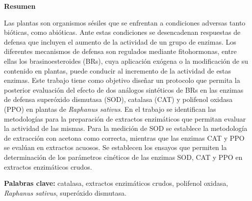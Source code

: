 {\bf \LARGE Resumen}

\medskip
\medskip
\medskip
\medskip
\medskip
\medskip

Las plantas son organismos sésiles que se enfrentan a condiciones adversas tanto bióticas, como abióticas. Ante estas condiciones se desencadenan respuestas de defensa que incluyen el aumento de la actividad de un grupo de enzimas. Los diferentes mecanismos de defensa son regulados mediante fitohormonas, entre ellas los brasinoesteroides (BRs), cuya aplicación exógena o la modificación de su contenido en plantas, puede conducir al incremento de la actividad de estas enzimas. Este trabajo tiene como objetivo diseñar un protocolo que permita la posterior evaluación del efecto de dos análogos sintéticos de BRs en las enzimas de defensa superóxido dismutasa (SOD), catalasa (CAT) y polifenol oxidasa (PPO) en plantas de \textit{Raphanus sativus}. En el trabajo se identifican las metodologías para la preparación de extractos enzimáticos que permitan evaluar la actividad de las mismas. Para la medición de SOD se establece la metodología de extracción con acetona como correcta, mientras que las enzimas CAT y PPO se evalúan en extractos acuosos. Se establecen los ensayos que permiten la determinación de los parámetros cinéticos de las enzimas SOD, CAT y PPO en extractos enzimáticos crudos.


\medskip
\medskip
\medskip
\medskip
\medskip
\medskip
\medskip
\medskip
\medskip
\medskip
\medskip
\medskip
\medskip
\medskip

{\bf Palabras clave:} catalasa,  extractos enzim\'aticos crudos, polifenol oxidasa, \textit{Raphanus sativus}, super\'oxido dismutasa.


